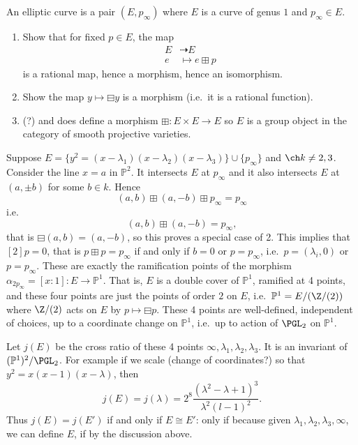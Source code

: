 \documentclass[a4paper]{article}
\renewcommand*{\P}{\mathbb{P}}
\newcommand{\rational}{\dashrightarrow} %
\begin{document}
\begin{definition}
  An elliptic curve is a pair \((E, p_\infty)\) where \(E\) is a curve of genus \(1\) and \(p_\infty \in E\).
\end{definition}

\begin{ex}\leavevmode
  \begin{enumerate}
  \item Show that for fixed \(p \in E\), the map
    \begin{align*}
      E &\rational E \\
      e &\mapsto e \boxplus p
    \end{align*}
    is a rational map, hence a morphism, hence an isomorphism.
  \item Show the map \(y \mapsto \boxminus y\) is a morphism (i.e.\ it is a rational function).
  \item (?) and does define a morphism \(\boxplus: E \times E \to E\) so \(E\) is a group object in the category of smooth projective varieties.
  \end{enumerate}
\end{ex}

Suppose \(E = \{y^2 = (x - \lambda_1)(x - \lambda_2)(x - \lambda_3)\} \cup \{p_\infty\}\) and \(\ch k \neq 2, 3\). Consider the line \(x = a\) in \(\P^2\). It intersects \(E\) at \(p_\infty\) and it also intersects \(E\) at \((a, \pm b)\) for some \(b \in k\). Hence
\[
  (a, b) \boxplus (a, -b) \boxplus p_\infty = p_\infty
\]
i.e.
\[
  (a, b) \boxplus (a, -b) = p_\infty,
\]
that is \(\boxminus (a, b) = (a, -b)\), so this proves a special case of 2. This implies that \([2] p = 0\), that is \(p \boxplus p = p_\infty\) if and only if \(b = 0\) or \(p = p_\infty\), i.e.\ \(p = (\lambda_i, 0)\) or \(p = p_\infty\). These are exactly the ramification points of the morphism \(\alpha_{2p_\infty} = [x:1]: E \to \P^1\). That is, \(E\) is a double cover of \(\P^1\), ramified at 4 points, and these four points are just the points of order \(2\) on \(E\), i.e.\ \(\P^1 = E/(\Z/(2))\) where \(\Z/(2)\) acts on \(E\) by \(p \mapsto \boxminus p\). These 4 points are well-defined, independent of choices, up to a coordinate change on \(\P^1\), i.e.\ up to action of \(\PGL_2\) on \(\P^1\).

Let \(j(E)\) be the cross ratio of these 4 points \(\infty, \lambda_1, \lambda_2, \lambda_3\). It is an invariant of \((\P^1)^2/\PGL_2\). For example if we scale (change of coordinates?) so that \(y^2 = x(x - 1)(x - \lambda)\), then
\[
  j(E) = j(\lambda) = 2^8 \frac{(\lambda^2 - \lambda + 1)^3}{\lambda^2 (l - 1)^2}.
\]
Thus \(j(E) = j(E')\) if and only if \(E \cong E'\): only if because given \(\lambda_1, \lambda_2, \lambda_3, \infty\), we can define \(E\), if by the discussion above.
\end{document}
